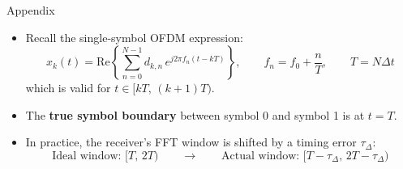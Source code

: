 \documentclass[xcolor=dvipsnames,aspectratio=169]{beamer} %
\begin{document}
\begin{frame}{Appendix}

\begin{itemize}
    \item Recall the single-symbol OFDM expression:
    \[
        x_k(t) = \mathrm{Re}\left\{ \sum_{n=0}^{N-1} d_{k,n}\, e^{j2\pi f_n (t-kT)} \right\},
        \qquad f_n = f_0 + \frac{n}{T}, \qquad T = N\Delta t
    \]
    which is valid for $t \in [kT,\,(k+1)T)$.

    \item The \textbf{true symbol boundary} between symbol 0 and symbol 1
    is at $t = T$.

    \item In practice, the receiver's FFT
    window is shifted by a timing
    error $\tau_\Delta$:
    \[
        \text{Ideal window: } [T,\,2T)
        \qquad\longrightarrow\qquad
        \text{Actual window: } [T-\tau_\Delta,\,2T-\tau_\Delta)
    \]
\end{itemize}

\end{frame}
\end{document}
